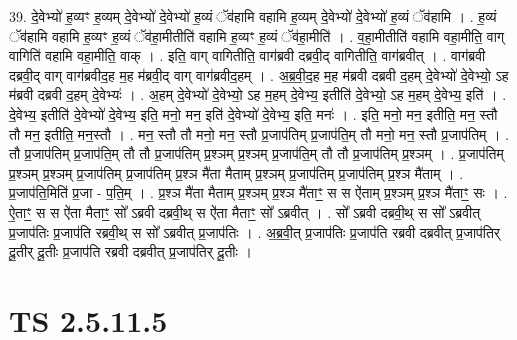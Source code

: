 \documentclass[17pt]{extarticle}
\begin{document}
39. दे॒वेभ्यो॑ ह॒व्यꣳ ह॒व्यम् दे॒वेभ्यो॑ दे॒वेभ्यो॑ ह॒व्यं ॅव॑हामि वहामि ह॒व्यम् दे॒वेभ्यो॑ दे॒वेभ्यो॑ ह॒व्यं ॅव॑हामि । . ह॒व्यं ॅव॑हामि वहामि ह॒व्यꣳ ह॒व्यं ॅव॑हा॒मीतीति॑ वहामि ह॒व्यꣳ ह॒व्यं ॅव॑हा॒मीति॑ । . व॒हा॒मीतीति॑ वहामि वहा॒मीति॒ वाग् वागिति॑ वहामि वहा॒मीति॒ वाक् । . इति॒ वाग् वागितीति॒ वाग॑ब्रवी दब्रवी॒द् वागितीति॒ वाग॑ब्रवीत् । . वाग॑ब्रवी दब्रवी॒द् वाग् वाग॑ब्रवीद॒ह म॒ह म॑ब्रवी॒द् वाग् वाग॑ब्रवीद॒हम् । . अ॒ब्र॒वी॒द॒ह म॒ह म॑ब्रवी दब्रवी द॒हम् दे॒वेभ्यो॑ दे॒वेभ्यो॒ ऽह म॑ब्रवी दब्रवी द॒हम् दे॒वेभ्यः॑ । . अ॒हम् दे॒वेभ्यो॑ दे॒वेभ्यो॒ ऽह म॒हम् दे॒वेभ्य॒ इतीति॑ दे॒वेभ्यो॒ ऽह म॒हम् दे॒वेभ्य॒ इति॑ । . दे॒वेभ्य॒ इतीति॑ दे॒वेभ्यो॑ दे॒वेभ्य॒ इति॒ मनो॒ मन॒ इति॑ दे॒वेभ्यो॑ दे॒वेभ्य॒ इति॒ मनः॑ । . इति॒ मनो॒ मन॒ इतीति॒ मन॒ स्तौ तौ मन॒ इतीति॒ मन॒स्तौ । . मन॒ स्तौ तौ मनो॒ मन॒ स्तौ प्र॒जाप॑तिम् प्र॒जाप॑ति॒म् तौ मनो॒ मन॒ स्तौ प्र॒जाप॑तिम् । . तौ प्र॒जाप॑तिम् प्र॒जाप॑ति॒म् तौ तौ प्र॒जाप॑तिम् प्र॒श्ञम् प्र॒श्ञम् प्र॒जाप॑ति॒म् तौ तौ प्र॒जाप॑तिम् प्र॒श्ञम् । . प्र॒जाप॑तिम् प्र॒श्ञम् प्र॒श्ञम् प्र॒जाप॑तिम् प्र॒जाप॑तिम् प्र॒श्ञ मै॑ता मैताम् प्र॒श्ञम् प्र॒जाप॑तिम् प्र॒जाप॑तिम् प्र॒श्ञ मै॑ताम् । . प्र॒जाप॑ति॒मिति॑ प्र॒जा - प॒ति॒म् । . प्र॒श्ञ मै॑ता मैताम् प्र॒श्ञम् प्र॒श्ञ मै॑ताꣳ॒॒ स स ऐ॑ताम् प्र॒श्ञम् प्र॒श्ञ मै॑ताꣳ॒॒ सः । . ऐ॒ताꣳ॒॒ स स ऐ॑ता मैताꣳ॒॒ सो᳚ ऽब्रवी दब्रवी॒थ् स ऐ॑ता मैताꣳ॒॒ सो᳚ ऽब्रवीत् । . सो᳚ ऽब्रवी दब्रवी॒थ् स सो᳚ ऽब्रवीत् प्र॒जाप॑तिः प्र॒जाप॑ति रब्रवी॒थ् स सो᳚ ऽब्रवीत् प्र॒जाप॑तिः । . अ॒ब्र॒वी॒त् प्र॒जाप॑तिः प्र॒जाप॑ति रब्रवी दब्रवीत् प्र॒जाप॑तिर् दू॒तीर् दू॒तीः प्र॒जाप॑ति रब्रवी दब्रवीत् प्र॒जाप॑तिर् दू॒तीः । \newline
\pagebreak
{}

\section{ TS 2.5.11.5 }
\end{document}
